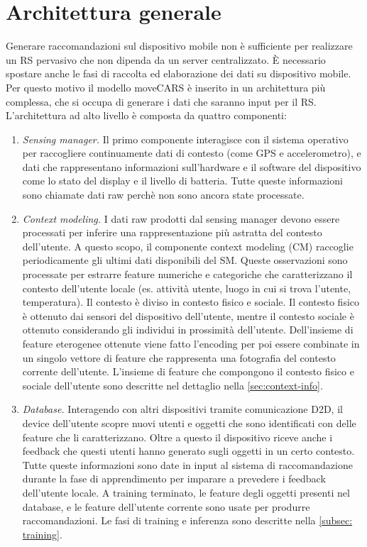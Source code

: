 \documentclass[12pt,italian]{report}
\begin{document}
\section{Architettura generale}
Generare raccomandazioni sul dispositivo mobile non è sufficiente per realizzare un RS pervasivo che non dipenda da un server centralizzato.  \`E necessario spostare anche le fasi di raccolta ed elaborazione dei dati su dispositivo mobile. Per questo motivo il modello moveCARS è inserito in un architettura più complessa, che si occupa di generare i dati che saranno input per il RS.
L'architettura ad alto livello è composta da quattro componenti:
\begin{enumerate}
 \item \textit{Sensing manager.} Il primo componente interagisce con il sistema operativo per raccogliere continuamente dati di contesto (come GPS e accelerometro), e dati che rappresentano informazioni sull'hardware e il software del dispositivo come lo stato del display e il livello di batteria. Tutte queste informazioni sono chiamate dati raw perchè non sono ancora state processate.
 
 \item \textit{Context modeling.} I dati raw prodotti dal sensing manager devono essere processati per inferire una rappresentazione più astratta del contesto dell'utente. A questo scopo, il componente context modeling (CM) raccoglie periodicamente gli ultimi dati disponibili del SM. Queste osservazioni sono processate per estrarre feature numeriche e categoriche che caratterizzano il contesto dell'utente locale (es. attività utente, luogo in cui si trova l'utente, temperatura). Il contesto è diviso in contesto fisico e sociale. Il contesto fisico è ottenuto  dai sensori del dispositivo dell'utente, mentre il contesto sociale è ottenuto considerando gli individui in prossimità dell'utente. Dell'insieme di feature eterogenee ottenute viene fatto l'encoding per poi essere combinate in un singolo vettore di feature che rappresenta una fotografia del contesto corrente dell'utente. L'insieme di feature che compongono il contesto fisico e sociale dell'utente sono descritte nel dettaglio nella \autoref{sec:context-info}.
 
 \item  \textit{Database.} Interagendo con altri dispositivi tramite comunicazione D2D, il device dell'utente scopre nuovi utenti e oggetti che sono identificati con delle feature che li caratterizzano. Oltre a questo il dispositivo riceve anche i feedback che questi utenti hanno generato sugli oggetti in un certo contesto. Tutte queste informazioni sono date in input al sistema di raccomandazione durante la fase di apprendimento per imparare a prevedere i feedback dell'utente locale. A training terminato, le feature degli oggetti presenti nel database, e le feature dell'utente corrente sono usate per produrre raccomandazioni. Le fasi di training e inferenza sono descritte nella \autoref{subsec: training}.
 

\end{enumerate}
\end{document}
